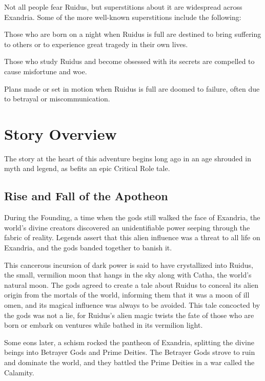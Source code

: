\documentclass[10pt,a4paper,twoside,bg=print,twocolumn,openany,nodeprecatedcode]{dndbook}
\begin{document}
Not all people fear Ruidus, but superstitions about it are widespread across Exandria. Some of the more well-known superstitions include the following:


\begin{description}[nolistsep]
\item[Harbinger.]
Those who are born on a night when Ruidus is full are destined to bring suffering to others or to experience great tragedy in their own lives.
\item[Malice.]
Those who study Ruidus and become obsessed with its secrets are compelled to cause misfortune and woe.
\item[Misadventure.]
Plans made or set in motion when Ruidus is full are doomed to failure, often due to betrayal or miscommunication.
\end{description}

  
\section{Story Overview}
The story at the heart of this adventure begins long ago in an age shrouded in myth and legend, as befits an epic Critical Role tale.

\subsection{Rise and Fall of the Apotheon}
During the Founding, a time when the gods still walked the face of Exandria, the world's divine creators discovered an unidentifiable power seeping through the fabric of reality. Legends assert that this alien influence was a threat to all life on Exandria, and the gods banded together to banish it.

This cancerous incursion of dark power is said to have crystallized into Ruidus, the small, vermilion moon that hangs in the sky along with Catha, the world's natural moon. The gods agreed to create a tale about Ruidus to conceal its alien origin from the mortals of the world, informing them that it was a moon of ill omen, and its magical influence was always to be avoided. This tale concocted by the gods was not a lie, for Ruidus's alien magic twists the fate of those who are born or embark on ventures while bathed in its vermilion light.

Some eons later, a schism rocked the pantheon of Exandria, splitting the divine beings into Betrayer Gods and Prime Deities. The Betrayer Gods strove to ruin and dominate the world, and they battled the Prime Deities in a war called the Calamity.
\end{document}
